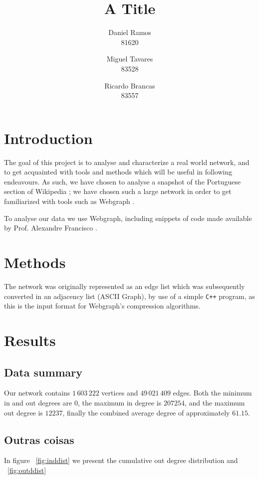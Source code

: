 \documentclass[9pt,a4paper]{article}
\title{A Title}
\author{Daniel Ramos \\ 81620 \and Miguel Tavares \\ 83528 \and Ricardo Brancas  \\ 83557}
\begin{document}
\maketitle

\section{Introduction}
The goal of this project is to analyse and characterize a real world network, and to  get 
acquainted with tools and methods which will be useful in following endeavours.
As such, we have chosen to analyse a snapshot of the Portuguese section of Wikipedia \cite{dataset};
we have chosen such a large network in order to get familiarized with tools such as Webgraph \cite{webgraph}.

To analyse our data we use Webgraph, including snippets of code made available
by Prof. Alexandre Francisco \cite{aplf}.


\section{Methods}
The network was originally represented as an edge list which was subsequently converted in an adjacency list (ASCII Graph), by use of a simple \texttt{C++} program, as this is the input
format for Webgraph's compression algorithms.





\section{Results}
\subsection{Data summary}
Our network contains $1\,603\,222$ vertices and $49\,021\,409$ edges. Both the minimum in and out degrees are $0$, the maximum in degree is $207254$, and the maximum out degree is $12237$, finally the combined average degree of approximately $61.15$.

\subsection{Outras coisas}

In figure ~\ref{fig:inddist} we present the cumulative out degree distribution and ~\ref{fig:outddist}
\end{document}
